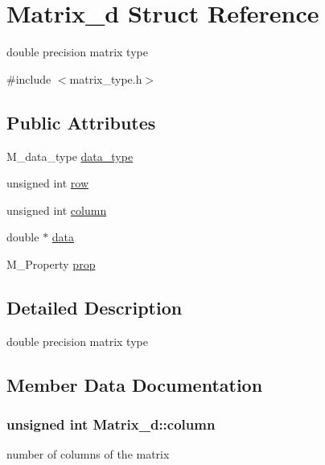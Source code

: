 \hypertarget{structMatrix__d}{}\section{Matrix\+\_\+d Struct Reference}
\label{structMatrix__d}


double precision matrix type  




{\ttfamily \#include $<$matrix\+\_\+type.\+h$>$}

\subsection*{Public Attributes}
\begin{DoxyCompactItemize}
\item 
M\+\_\+data\+\_\+type \hyperlink{structMatrix__d_abd54be0a1d23b49811055d9c06690c5d}{data\+\_\+type}
\item 
unsigned int \hyperlink{structMatrix__d_ad4e549017d2d1c5dd83e76788de8a89d}{row}
\item 
unsigned int \hyperlink{structMatrix__d_afa4d9db2998b2fb84aa14db7ba8ae54f}{column}
\item 
double $\ast$ \hyperlink{structMatrix__d_a6a9f862ced230c4b29277846ed436c90}{data}
\item 
M\+\_\+\+Property \hyperlink{structMatrix__d_af7a8caafdd655171e1c6a9b1f532aa9a}{prop}
\end{DoxyCompactItemize}


\subsection{Detailed Description}
double precision matrix type 

\subsection{Member Data Documentation}
\subsubsection[{\texorpdfstring{column}{column}}]{\setlength{\rightskip}{0pt plus 5cm}unsigned int Matrix\+\_\+d\+::column}\hypertarget{structMatrix__d_afa4d9db2998b2fb84aa14db7ba8ae54f}{}\label{structMatrix__d_afa4d9db2998b2fb84aa14db7ba8ae54f}
number of columns of the matrix 
